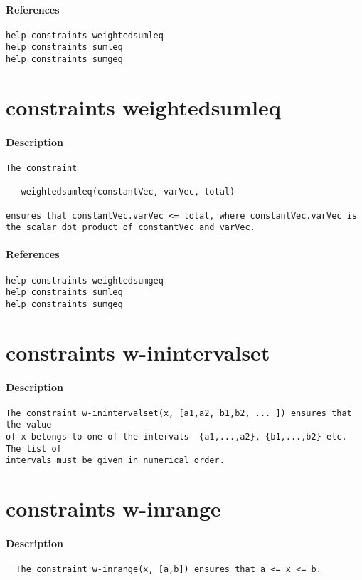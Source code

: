\paragraph{References}
{\footnotesize
\begin{verbatim}
help constraints weightedsumleq
help constraints sumleq
help constraints sumgeq
\end{verbatim}
}
\section{constraints weightedsumleq}
\paragraph{Description}
{\footnotesize
\begin{verbatim}
The constraint

   weightedsumleq(constantVec, varVec, total)

ensures that constantVec.varVec <= total, where constantVec.varVec is
the scalar dot product of constantVec and varVec.
\end{verbatim}
}
\paragraph{References}
{\footnotesize
\begin{verbatim}
help constraints weightedsumgeq
help constraints sumleq
help constraints sumgeq
\end{verbatim}
}
\section{constraints w-inintervalset}
\paragraph{Description}
{\footnotesize
\begin{verbatim}
The constraint w-inintervalset(x, [a1,a2, b1,b2, ... ]) ensures that the value
of x belongs to one of the intervals  {a1,...,a2}, {b1,...,b2} etc. The list of
intervals must be given in numerical order.
\end{verbatim}
}
\section{constraints w-inrange}
\paragraph{Description}
{\footnotesize
\begin{verbatim}
  The constraint w-inrange(x, [a,b]) ensures that a <= x <= b.
\end{verbatim}
}
